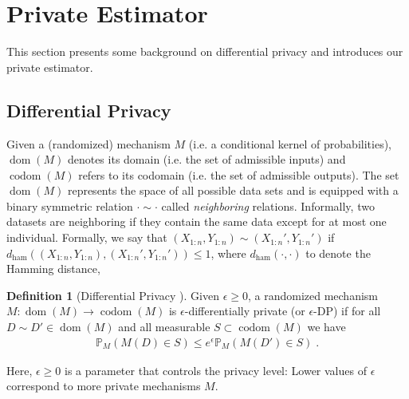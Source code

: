 \documentclass{article}
\theoremstyle{plain}
\theoremstyle{definition}
\newtheorem{definition}[theorem]{Definition}
\theoremstyle{remark}
\newcommand{\Prob}[0]{\mathbb{P}}
\newcommand\mech[1]{{#1}}
\newcommand\dom[1]{\operatorname{dom}\left({#1}\right)}
\newcommand\codom[1]{\operatorname{codom}\left({#1}\right)}
\newcommand\ham[2]{d_\mathrm{ham}\left( {#1}, {#2} \right)}
\newcommand\p[1]{\left( {#1}\right)}
\begin{document}
\section{Private Estimator}
\label{sec:privatemechanism}

This section presents some background on differential privacy and introduces our private estimator.

\subsection{Differential Privacy}

Given a (randomized) mechanism $\mech{M}$ (i.e. a conditional kernel of probabilities), $\dom{\mech{M}}$ denotes its domain (i.e. the set of admissible inputs) and $\codom{\mech{M}}$ refers to its codomain (i.e. the set of admissible outputs). 
The set $\dom{\mech{M}}$ represents the space of all possible data sets and is equipped with a binary symmetric relation $\cdot \sim \cdot$ called \emph{neighboring} relations. 
Informally, two datasets are neighboring if they contain the same data except for at most one individual. 
Formally, we say that $(X_{1:n}, Y_{1:n}) \sim (X_{1:n}', Y_{1:n}')$ if $\ham{(X_{1:n}, Y_{1:n})}{(X_{1:n}', Y_{1:n}')} \leq 1$, where $\ham{\cdot}{\cdot}$ to denote the Hamming distance, 
\begin{definition}[Differential Privacy \cite{dwork2006calibrating}]
     Given $\epsilon \geq 0$, a randomized mechanism $\mech{M}: \dom{\mech{M}} \rightarrow \codom{\mech{M}}$ is $\epsilon$-differentially private (or $\epsilon$-DP) if for all $D \sim D' \in \dom{M}$ and all measurable $S \subset \codom{\mech{M}}$ we have
\begin{equation}
\begin{aligned}
    \Prob_{\mech{M}}\p{\mech{M}(D) \in S} \leq e^\epsilon \Prob_{\mech{M}}\p{\mech{M}(D') \in S} \;.
\end{aligned}
\end{equation}
\end{definition}

Here, $\epsilon \geq 0$ is a parameter that controls the privacy level: Lower values of $\epsilon$ correspond to more private mechanisms $M$. 
\end{document}

